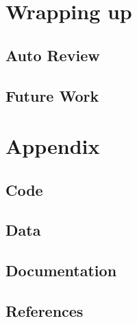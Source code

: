 \documentclass[11pt, a4paper, notitlepage]{report}
\begin{document}
    \chapter{Wrapping up}
        \section{Auto Review}
        \section{Future Work}
    \chapter{Appendix}
        \section{Code}
        \section{Data}
        \section{Documentation}
        \section{References}
\end{document}
